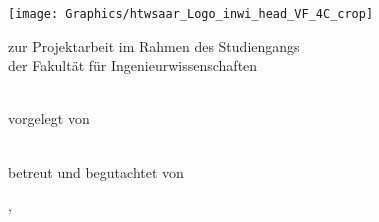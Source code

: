 \begin{titlepage}\linespread{1.5}\selectfont
\texttt{[image: Graphics/htwsaar\_Logo\_inwi\_head\_VF\_4C\_crop]}
  \begin{center}
    \large  
    \hfill
    \vfill
    \begingroup
      \Large\bfseries\myDegreeType 
    \endgroup
		
		\bigskip
		
    zur Projektarbeit im Rahmen des Studiengangs \myDegreeCourse \\
    der Fakultät für Ingenieurwissenschaften \\ 
    
  \vfill
	
  \begingroup
    \Large\bfseries\myTitle 
  \endgroup
	
	\bigskip
	
  vorgelegt von \\
  \myName \\
  \mySecondName
	
  \vfill
	
  betreut und begutachtet von \\
  \myFirstProf 
	
  \vfill
	
  \myLocation, \myTime                   

    \end{center}       
\end{titlepage}   